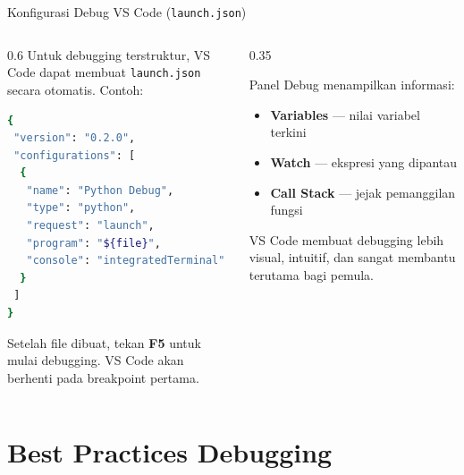 \documentclass[aspectratio=169, table]{beamer}
\begin{document}
\begin{frame}[fragile]{Konfigurasi Debug VS Code (\texttt{launch.json})}
\vspace{10pt}

\begin{columns}[T]

\begin{column}{0.6\linewidth}
Untuk debugging terstruktur, VS Code dapat membuat
\texttt{launch.json} secara otomatis. Contoh:

\begin{lstlisting}[language=bash, basicstyle=\ttfamily\scriptsize]
{
 "version": "0.2.0",
 "configurations": [
  {
   "name": "Python Debug",
   "type": "python",
   "request": "launch",
   "program": "${file}",
   "console": "integratedTerminal"
  }
 ]
}
\end{lstlisting}

Setelah file dibuat, tekan \textbf{F5} untuk mulai debugging.
VS Code akan berhenti pada breakpoint pertama.
\end{column}

\begin{column}{0.35\linewidth}

Panel Debug menampilkan informasi:

\begin{itemize}
    \item \textbf{Variables} — nilai variabel terkini
    \item \textbf{Watch} — ekspresi yang dipantau
    \item \textbf{Call Stack} — jejak pemanggilan fungsi
\end{itemize}

VS Code membuat debugging lebih visual,
intuitif, dan sangat membantu terutama bagi pemula.
\end{column}

\end{columns}

\end{frame}

\section{Best Practices Debugging}
\end{document}
